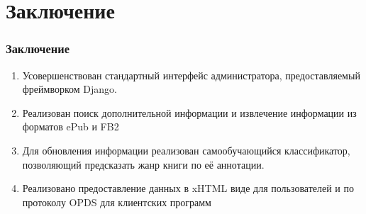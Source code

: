 \documentclass[handout]{beamer}
\begin{document}
\section{Заключение}
  \begin{frame}
    \frametitle{Заключение}
    \begin{enumerate}
	  \item Усовершенствован стандартный интерфейс администратора, предоставляемый фреймворком Django.
	  \item Реализован поиск дополнительной информации и извлечение информации из форматов ePub и FB2
      \item Для обновления информации реализован самообучающийся классификатор, позволяющий предсказать жанр книги по её аннотации.
	  \item Реализовано предоставление данных в xHTML виде для пользователей и по протоколу OPDS для клиентских программ
    \end{enumerate}
  \end{frame}
\end{document}
